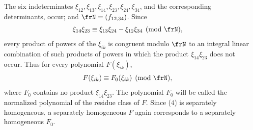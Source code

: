 \documentclass[11pt]{article}
\begin{document}
The six indeterminates \(\xi_{12},\xi_{13},\xi_{14},\xi_{23},\xi_{24},\xi_{34}\), and the corresponding determinants, occur; and \(\frN=(f_{12,34})\). Since
\begin{equation}
        \xi_{14}\xi_{23}\equiv \xi_{13}\xi_{24}-\xi_{12}\xi_{34}\pmod{\frN},
\end{equation}
every product of powers of the \(\xi_{ik}\) is congruent modulo \(\frN\) to an integral linear combination of such products of powers in which the product \(\xi_{14}\xi_{23}\) does not occur. Thus for every polynomial \(F(\xi_{ik})\),
\begin{equation}
        F(\xi_{ik})\equiv F_0(\xi_{ik})\pmod{\frN},
\end{equation}
where \(F_0\) contains no product \(\xi_{14}\xi_{23}\). The polynomial \(F_0\) will be called the normalized polynomial of the residue class of \(F\). Since (4) is separately homogeneous, a separately homogeneous \(F\) again corresponds to a separately homogeneous \(F_0\).
\end{document}
